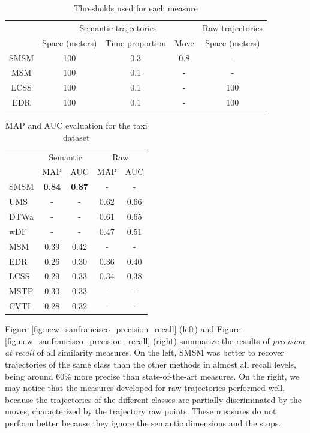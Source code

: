 \begin{table}[!h]
\scriptsize
  \centering
  \begin{tabular}{|c|c|c|c|c|}
  \hline
  & \multicolumn{3}{c|}{Semantic trajectories} & \multicolumn{1}{c|}{Raw trajectories} \\
 	\cline{2-5}
  & Space (meters) & Time proportion & Move & Space (meters) \\
  \hline
 SMSM & 100 & 0.3 & 0.8 & - \\
 MSM & 100 & 0.1 & - & - \\
 LCSS & 100 & 0.1 & - & 100 \\
 EDR & 100 & 0.1 & - & 100 \\
    \hline
  \end{tabular}
  \caption{Thresholds used for each measure}
  \label{tab:new_san_francisco_thresholds}
\end{table}


\begin{table}[h]
\scriptsize
  \centering
  \begin{tabular}{|l|c|c|c|c|}
  \hline
 & \multicolumn{2}{c}{Semantic} & \multicolumn{2}{|c|}{Raw} \\
 	\cline{2-5}
 & MAP & AUC & MAP & AUC \\
  \hline
SMSM & \textbf{0.84} & \textbf{0.87} & - & -\\
UMS & - & - & 0.62 & 0.66 \\
DTWa & - & - & 0.61 & 0.65 \\
wDF & - & - & 0.47 & 0.51 \\
MSM & 0.39 & 0.42 & - & - \\
EDR & 0.26 & 0.30 & 0.36 & 0.40 \\
LCSS & 0.29 & 0.33 & 0.34 & 0.38 \\
MSTP & 0.30 & 0.33 & - & - \\
CVTI & 0.28 & 0.32 & - & - \\
    \hline
  \end{tabular}
  \caption{MAP and AUC evaluation for the taxi dataset}
  \label{tab:new_sanfrancisco_measures_map_auc}
\end{table}


Figure \ref{fig:new_sanfrancisco_precision_recall} (left) and Figure \ref{fig:new_sanfrancisco_precision_recall} (right) {summarize the results of \emph{precision at recall}  of all similarity measures. On the left, SMSM was better to recover trajectories of the same class than the other methods in almost all recall levels, being around  60\% more precise than  state-of-the-art measures. On the right, we may notice that the measures developed for raw trajectories performed well, because the trajectories of the different classes are partially discriminated by the moves, characterized by the trajectory raw points. These measures do not perform better because they ignore the semantic dimensions and the stops.}


